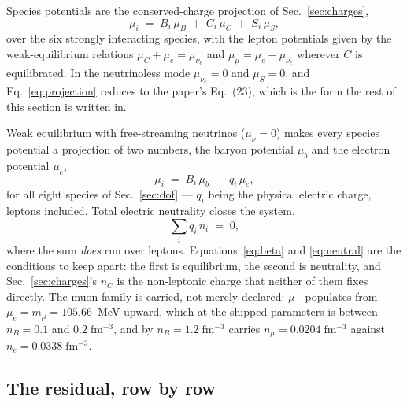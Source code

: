 \documentclass[aps,prc,onecolumn,superscriptaddress,nofootinbib,10pt]{revtex4-2}
\newcommand{\nB}{n_B}
\newcommand{\nC}{n_C}
\newcommand{\muB}{\mu_B}
\newcommand{\muC}{\mu_C}
\newcommand{\muS}{\mu_S}
\begin{document}
Species potentials are the conserved-charge projection of
Sec.~\ref{sec:charges},
%
\begin{equation}
\mu_i \;=\; B_i\,\muB \;+\; C_i\,\muC \;+\; S_i\,\muS ,
\label{eq:projection}
\end{equation}
%
over the six strongly interacting species, with the lepton potentials given by
the weak-equilibrium relations $\muC + \mu_e = \mu_{\nu_e}$ and
$\mu_\mu = \mu_e - \mu_{\nu_e}$ wherever $C$ is equilibrated. In the
neutrinoless mode $\mu_{\nu_e} = 0$ and $\muS = 0$, and
Eq.~\eqref{eq:projection} reduces to the paper's Eq.~(23), which is the form
the rest of this section is written in.

\medskip
\noindent
Weak equilibrium with free-streaming neutrinos ($\mu_{\nu} = 0$) makes every
species potential a projection of two numbers, the baryon potential $\mu_b$
and the electron potential $\mu_e$,
%
\begin{equation}
\mu_i \;=\; B_i\,\mu_b \;-\; q_i\,\mu_e ,
\label{eq:beta}
\end{equation}
%
for all eight species of Sec.~\ref{sec:dof} --- $q_i$ being the physical
electric charge, leptons included. Total electric neutrality closes the
system,
%
\begin{equation}
\sum_i q_i\, n_i \;=\; 0 ,
\label{eq:neutral}
\end{equation}
%
where the sum \emph{does} run over leptons. Equations~\eqref{eq:beta} and
\eqref{eq:neutral} are the conditions to keep apart: the first is
equilibrium, the second is neutrality, and Sec.~\ref{sec:charges}'s $\nC$ is
the non-leptonic charge that neither of them fixes directly. The muon family
is carried, not merely declared: $\mu^-$ populates from
$\mu_e = m_\mu = 105.66$~MeV upward, which at the shipped parameters is
between $\nB = 0.1$ and $0.2\;\mathrm{fm^{-3}}$, and by
$\nB = 1.2\;\mathrm{fm^{-3}}$ carries $n_\mu = 0.0204\;\mathrm{fm^{-3}}$
against $n_e = 0.0338\;\mathrm{fm^{-3}}$.

\subsection{The residual, row by row}
\label{sec:residual}
\end{document}
